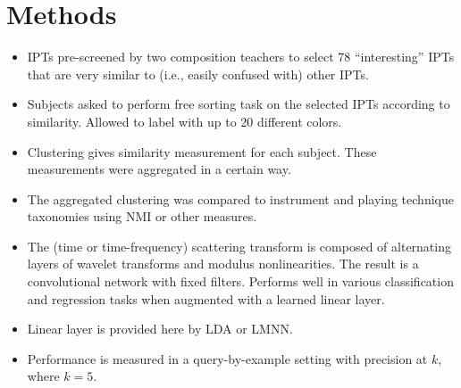 \documentclass{article}
\begin{document}
\section{Methods}
\label{sec:methods}

\begin{itemize}
\item IPTs pre-screened by two composition teachers to select 78 ``interesting'' IPTs that are very similar to (i.e., easily confused with) other IPTs.
\item Subjects asked to perform free sorting task on the selected IPTs according to similarity. Allowed to label with up to 20 different colors.
\item Clustering gives similarity measurement for each subject. These measurements were aggregated in a certain way.
\item The aggregated clustering was compared to instrument and playing technique taxonomies using NMI or other measures.
\item The (time or time-frequency) scattering transform is composed of alternating layers of wavelet transforms and modulus nonlinearities. The result is a convolutional network with fixed filters. Performs well in various classification and regression tasks when augmented with a learned linear layer.
\item Linear layer is provided here by LDA or LMNN.
\item Performance is measured in a query-by-example setting with precision at $k$, where $k = 5$.
\end{itemize}




\end{document}
